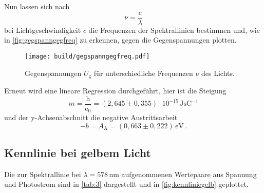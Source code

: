 Nun lassen sich nach
\begin{equation*}
    \nu = \dfrac{\text{c}}{\lambda}
\end{equation*}
bei Lichtgeschwindigkeit $c$ die Frequenzen der Spektrallinien bestimmen und, wie in \autoref{fig:gegspanngegfreq} zu erkennen, gegen die Gegenspannungen plotten.

\begin{figure}
    \centering
    \texttt{[image: build/gegspanngegfreq.pdf]}
    \caption{Gegenspannungen $U_\text{g}$ für unterschiedliche Frequenzen $\nu$ des Lichts.}
    \label{fig:gegspanngegfreq}
\end{figure}

Erneut wird eine lineare Regression durchgeführt, hier ist die Steigung
\begin{equation*}
    m = \dfrac{\text{h}}{\text{e}_0} = (2,645 \pm 0,355) \cdot 10^{-15} \,\si{\joule\second\coulomb^{-1}}
\end{equation*}
und der y-Achsenabschnitt die negative Austrittsarbeit 
\begin{equation*}
    -b = A_\text{A} = (0,663 \pm 0,222) \,\si{\eV} \,.
\end{equation*}


\subsection{Kennlinie bei gelbem Licht}

Die zur Spektrallinie bei $\lambda = 578 \,\si{\nano\meter}$ aufgenommenen Wertepaare aus Spannung und Photostrom sind in \autoref{tab:3} dargestellt und in \autoref{fig:kennliniegelb} geplottet.

